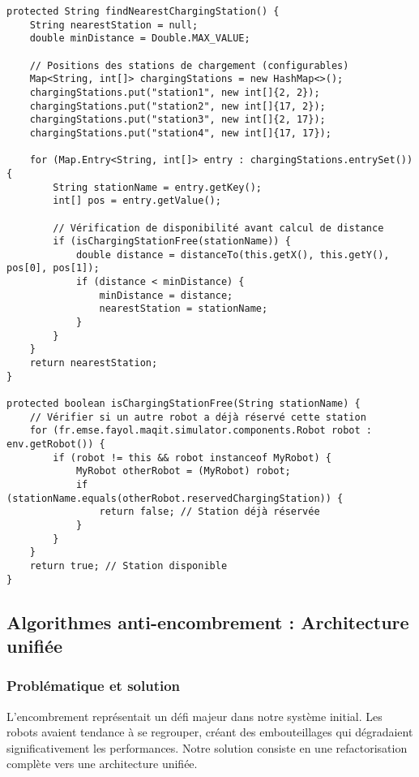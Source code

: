 \documentclass[12pt,a4paper]{article}
\begin{document}
\begin{lstlisting}[caption=Recherche intelligente de station de charge]
protected String findNearestChargingStation() {
    String nearestStation = null;
    double minDistance = Double.MAX_VALUE;

    // Positions des stations de chargement (configurables)
    Map<String, int[]> chargingStations = new HashMap<>();
    chargingStations.put("station1", new int[]{2, 2});
    chargingStations.put("station2", new int[]{17, 2});
    chargingStations.put("station3", new int[]{2, 17});
    chargingStations.put("station4", new int[]{17, 17});

    for (Map.Entry<String, int[]> entry : chargingStations.entrySet()) {
        String stationName = entry.getKey();
        int[] pos = entry.getValue();

        // Vérification de disponibilité avant calcul de distance
        if (isChargingStationFree(stationName)) {
            double distance = distanceTo(this.getX(), this.getY(), pos[0], pos[1]);
            if (distance < minDistance) {
                minDistance = distance;
                nearestStation = stationName;
            }
        }
    }
    return nearestStation;
}

protected boolean isChargingStationFree(String stationName) {
    // Vérifier si un autre robot a déjà réservé cette station
    for (fr.emse.fayol.maqit.simulator.components.Robot robot : env.getRobot()) {
        if (robot != this && robot instanceof MyRobot) {
            MyRobot otherRobot = (MyRobot) robot;
            if (stationName.equals(otherRobot.reservedChargingStation)) {
                return false; // Station déjà réservée
            }
        }
    }
    return true; // Station disponible
}
\end{lstlisting}

\subsection{Algorithmes anti-encombrement : Architecture unifiée}

\subsubsection{Problématique et solution}

L'encombrement représentait un défi majeur dans notre système initial. Les robots avaient tendance à se regrouper, créant des embouteillages qui dégradaient significativement les performances. Notre solution consiste en une refactorisation complète vers une architecture unifiée.
\end{document}
